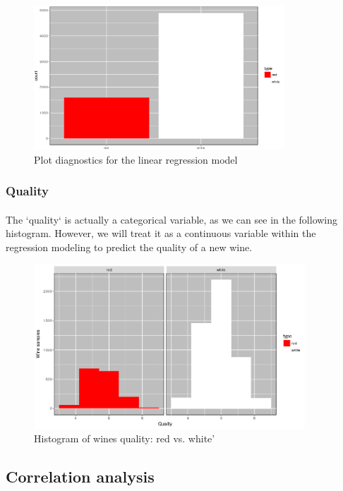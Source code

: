 \documentclass[10pt]{article}
\begin{document}
\begin{figure}[H]
	\centering
	\includegraphics[width=3.7in]{figures/type-distribution.png}
	\caption{Plot diagnostics for the linear regression model} 
	\label{figure:type}
\end{figure}

\subsubsection{Quality}
\paragraph*{}
The `quality` is actually a categorical variable, as we can see in the following histogram. However, we will treat it as a continuous variable within the regression modeling to predict the quality of a new wine.

\begin{figure}[H]
	\centering
	\includegraphics[width=4in]{figures/quality-distribution.png}
	\caption{Histogram of wines quality: red vs. white'} 
	\label{figure:quality}
\end{figure}

\subsection{Correlation analysis}
\end{document}

